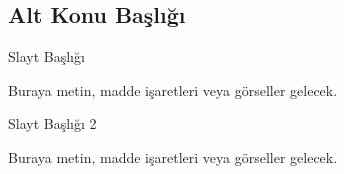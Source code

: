     \subsection{Alt Konu Başlığı}

        \begin{frame}{Slayt Başlığı}
            \justifying{} %
            
            Buraya metin, madde işaretleri veya görseller gelecek.
            
        \end{frame}

        \begin{frame}{Slayt Başlığı 2}
            \begin{itemize}
                Buraya metin, madde işaretleri veya görseller gelecek.
            \end{itemize}
        \end{frame}
